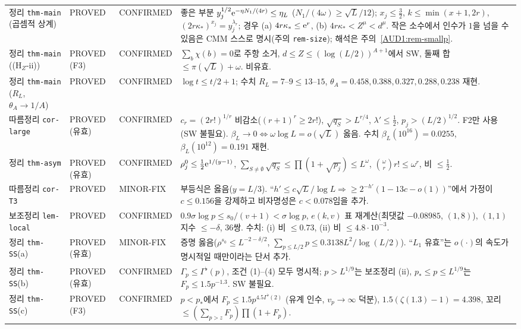 \begin{center}
\begin{longtable}{p{}p{}p{}p{}}
정리 \texttt{thm-main} (곱셈적 상계) & PROVED & CONFIRMED & 좋은 부분 $y_j^{1/2}\mathrm{e}^{-\eta N_1/(4r)}\le\eta_L$ ($N_1/(4\omega)\ge\sqrt L/12$); $x_j\le\frac32$, $k\le\min(x+1,2r)$, $(2r\kappa_*)^{x_j}=y_j^{\lambda_r}$; 경우 (a) $4r\kappa_*\le\mathrm{e}^r$, (b) $4r\kappa_*<Z^\mu<d^\mu$. 작은 소수에서 인수가 $1$을 넘을 수 있음은 CMM 스스로 명시(주의 \texttt{rem-size}); 해석은 주의~\ref{AUD1:rem-smallp}.\\
정리 \texttt{thm-main} ((H$_Z$-ii)) & PROVED (F3) & CONFIRMED & $\sum_b\chi(b)=0$로 주항 소거, $d\le Z\le(\log(L/2))^{A+1}$에서 SW, 둘째 합 $\le\pi(\sqrt L)+\omega$. 비유효.\\
정리 \texttt{thm-main} ($R_L$, $\theta_A\to1/A$) & PROVED & CONFIRMED & $\log t\le t/2+1$; 수치 $R_L=7$--$9\le13$--$15$, $\theta_A=0.458,0.388,0.327,0.288,0.238$ 재현.\\
따름정리 \texttt{cor-large} & PROVED (유효) & CONFIRMED & $c_r=(2r!)^{1/r}$ 비감소($(r+1)^r\ge2r!$), $\sqrt{q_S}>L^{r/4}$, $\lambda'\le\frac12$, $p_j>(L/2)^{1/2}$. F2만 사용(SW 불필요). $\beta_L\to0\iff\omega\log L=o(\sqrt L)$ 옳음. 수치 $\beta_L(10^{16})=0.0255$, $\beta_L(10^{12})=0.191$ 재현.\\
정리 \texttt{thm-asym} & PROVED (유효) & CONFIRMED & $\rho^0_j\le\frac12\mathrm{e}^{1/(y-1)}$, $\sum_{S\ne\emptyset}\sqrt{q_S}\le\prod(1+\sqrt{p_j})\le L^\omega$, $\binom\omega rr!\le\omega^r$, 비 $\le\frac12$.\\
따름정리 \texttt{cor-T3} & PROVED & MINOR-FIX & 부등식은 옳음($y=L/3$). ``$h'\le c\sqrt L/\log L\Rightarrow\ge2^{-h'}(1-13c-o(1))$''에서 가정이 $c\le0.156$을 강제하고 비자명성은 $c<0.078$임을 추가.\\
보조정리 \texttt{lem-local} & PROVED & CONFIRMED & $0.9\sigma\log p\le s_0/(v+1)<\sigma\log p$, $e(k,v)$ 표 재계산(최댓값 $-0.08985$, $(1,8)$), $(1,1)$ 지수 $\le-\delta$, 36쌍. 수치: (i) 비 $\le0.73$, (ii) 비 $\le4.8\cdot10^{-3}$.\\
정리 \texttt{thm-SS}(a) & PROVED (유효) & MINOR-FIX & 증명 옳음($\rho^{s_0}\le L^{-2-\delta/2}$, $\sum_{p\le L/2}p\le0.3138L^2/\log(L/2)$). ``$L_1$ 유효''는 $o(\cdot)$의 속도가 명시적일 때만이라는 단서 추가.\\
정리 \texttt{thm-SS}(b) & PROVED (유효) & CONFIRMED & $\Gamma_p\le\Gamma^\flat(p)$, 조건 (1)--(4) 모두 명시적; $p>L^{1/9}$는 보조정리 (ii), $p_*\le p\le L^{1/9}$는 $F_p\le1.5p^{-1.3}$. SW 불필요.\\
정리 \texttt{thm-SS}(c) & PROVED (F3) & CONFIRMED & $p<p_*$에서 $F_p\le1.5p^{4.5\Gamma^\flat(2)}$ (유계 인수, $v_p\to\infty$ 덕분), $1.5(\zeta(1.3)-1)=4.398$, 꼬리 $\le(\sum_{p>z}F_p)\prod(1+F_p)$.\\

\end{longtable}
\end{center}
